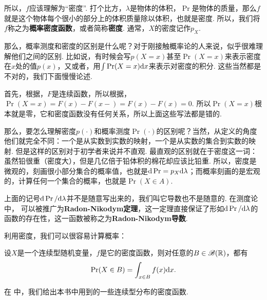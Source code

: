 所以，$f$应该理解为“密度”. 打个比方，$\lambda$是物体的体积，$\Pr$是物体的质量，那么$f$就是这个物体每个很小的部分上的体积质量除以体积，也就是密度. 所以，我们将$f$称之为\textbf{概率密度函数}，或者简称\textbf{密度}. 通常，$X$的密度记作$p_X$. 

那么，概率测度和密度的区别是什么呢？对于刚接触概率论的人来说，似乎很难理解他们之间的区别. 比如说，有时候会写$p(X=x)$甚至$\Pr(X=x)$来表示密度在$x$处的值$p(x)$，又或者，用$\int\Pr(X=x)\mathrm{d} x$来表示对密度的积分. 这些当然都是不对的，我们下面慢慢论述. 

首先，根据，$F$是连续函数，所以根据，$\Pr(X=x)=F(x)-F(x-)=F(x)-F(x)=0$. 所以$\Pr(X=x)$根本就是零，它和密度函数没有任何关系，所以上面这些写法都是错的. 

那么，要怎么理解密度$p(\cdot)$和概率测度$\Pr(\cdot)$的区别呢？当然，从定义的角度他们就完全不同：一个是从实数到实数的映射，一个是从实数的集合到实数的映射. 但是这样的区别对于初学者来说并不直观. 最直观的区别就在于密度这一词：虽然铅很重（密度大），但是几亿倍于铅体积的棉花却应该比铅重. 所以，密度是微观的，刻画很小部分集合的概率值，也就是$\mathrm{d}\Pr=p_X\mathrm{d} \lambda$；而概率刻画的是宏观的，计算任何一个集合的概率，也就是$\Pr(X\in A)$.

\begin{remark}
    上面的记号$\mathrm{d}\Pr/\mathrm{d}\lambda$并不是随意写出来的，我们叫它导数也不是随意的. 在测度论中， 可以被推广为\textbf{Radon-Nikodym定理}，这一定理直接保证了形如$\mathrm{d}\Pr/\mathrm{d}\lambda$的函数的存在性，这一函数被称之为\textbf{Radon-Nikodym导数}. 
\end{remark}

利用密度，我们可以很容易计算概率：
\begin{theorem}\label{theorem:continuous-prob}
设$X$是一个连续型随机变量，$f$是它的密度函数，则对任意的$B\in\mathscr{B}(\mathbb{R})$，都有
\[\Pr(X\in B)=\int_{x\in B}f(x)\mathrm{d} x.\]
\end{theorem}

在 中，我们给出本书中用到的一些连续型分布的密度函数. 

